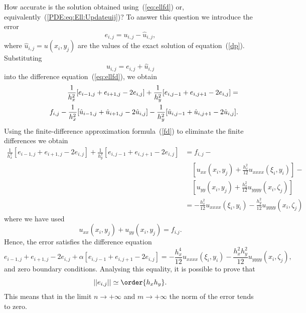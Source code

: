 How accurate is the solution obtained using~(\ref{eq:ellfd}) or,
equivalently~(\ref{PDE:eq:Ell:Updateuij})? To answer this question
we introduce the error
%
\begin{equation*}
  e_{i,j}=u_{i,j}-\hat u_{i,j},
\end{equation*}
%
where $\hat u_{i,j}=u(x_i,y_j)$ are the values of the exact solution
of equation~(\ref{dp}). Substituting
%
\begin{equation*}
  u_{i,j}=e_{i,j}+\hat u_{i,j}
\end{equation*}
%
into the difference equation~(\ref{eq:ellfd}), we obtain
%
\begin{eqnarray*}
 & & \frac{1}{h_x^2}[e_{i-1,j}+e_{i+1,j}-2e_{i,j}] +
      \frac{1}{h_y^2}[e_{i,j-1}+e_{i,j+1}-2e_{i,j}] = \\
 & & \hspace{10mm} f_{i,j} -
     \frac{1}{h_x^2}[\hat u_{i-1,j}+\hat u_{i+1,j}-2\hat u_{i,j}] -
     \frac{1}{h_y^2}[\hat u_{i,j-1}+\hat u_{i,j+1}-2\hat u_{i,j}].
\end{eqnarray*}
%
Using the finite-difference approximation formula~(\ref{fd}) to
eliminate the finite differences we obtain
%
\begin{align*}
  \frac{1}{h_x^2}[e_{i-1,j}+e_{i+1,j}-2e_{i,j}] +
     \frac{1}{h_y^2}[e_{i,j-1}+e_{i,j+1}-2e_{i,j}] & =
     f_{i,j} - \\
     & \quad [u_{xx}(x_i,y_j) + \frac{h_x^2}{12}u_{xxxx}(\xi_i,y_i)] -
     \\
     & \quad [u_{y y}(x_i,y_j)+\frac{h_2^2}{12}u_{yyyy}(x_i,\zeta_j)] \\
     & = - \frac{h_x^2}{12}u_{xxxx}(\xi_i,y_i) -
     \frac{h_y^2}{12}u_{yyyy}(x_i,\zeta_j)
\end{align*}
%
where we have used
%
\begin{equation*}
  u_{xx}(x_i,y_j)+u_{y y}(x_i,y_j)=f_{i.j}.
\end{equation*}
%
Hence, the error satisfies the difference equation
%
\begin{equation*}
  e_{i-1,j}+e_{i+1,j}-2e_{i,j}+\alpha[e_{i,j-1}+e_{i,j+1}-2e_{i,j}]=
  -\frac{h_x^4}{12}u_{xxxx}(\xi_i,y_i)-
  \frac{h_x^2 h_y^2}{12}u_{yyyy}(x_i,\zeta_j),
\end{equation*}
%
and zero boundary conditions. Analysing this equality, it is possible
to prove that
%
\begin{equation*}
  ||e_{i,j}|| \simeq \order{h_x h_y}.
\end{equation*}
%
This means that in the limit $n\to +\infty$ and $m\to +\infty$ the
norm of the error tends to zero.

